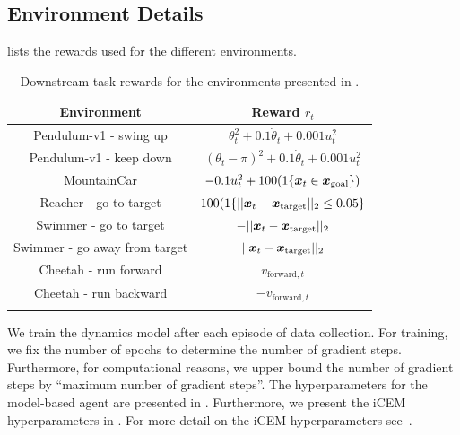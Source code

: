 \subsection{Environment Details}
 lists the rewards used for the different environments. 
\begin{table}[htb]
    \centering
    \caption{Downstream task rewards for the environments presented in .}
    \label{tab:environment_rewards}
\begin{tabular}{cc}
\midrule
\textbf{Environment}                   & \textbf{Reward} $r_t$                                                                                                      \\
\midrule
Pendulum-v1 - swing up        & $\theta_t^2 + 0.1 \Dot{\theta}_t + 0.001 u_t^2$                      \\
Pendulum-v1 - keep down       & $(\theta_t-\pi)^2 + 0.1 \Dot{\theta}_t + 0.001 u_t^2$  \\
MountainCar                   & $-0.1 u_t^2  + 100 (1\{{\bm{x}}_t \in {\bm{x}}_{\text{goal}}\})$                            \\
Reacher - go to target        & 
$100 (1\{||{\bm{x}}_t - {\bm{x}}_{\text{target}}||_2\leq 0.05\}$ \\
Swimmer - go to target        & $-||{\bm{x}}_t - {\bm{x}}_{\text{target}}||_2$                                                                                     \\
Swimmer - go away from target & $||{\bm{x}}_t - {\bm{x}}_{\text{target}}||_2$                                                                                      \\
Cheetah - run forward         & $v_{\text{forward}, t}$                                                                                                 \\
Cheetah - run backward        & $-v_{\text{forward}, t}$              \\
\hline \\
\end{tabular}
\end{table}
We train the dynamics model after each episode of data collection. For training, we fix the number of epochs to determine the number of gradient steps. Furthermore, for computational reasons, we upper bound the number of gradient steps by ``maximum number of gradient steps''. The hyperparameters for the model-based agent are presented in . Furthermore, we present the iCEM hyperparameters in . For more detail on the iCEM hyperparameters see~\cite{iCem}.
